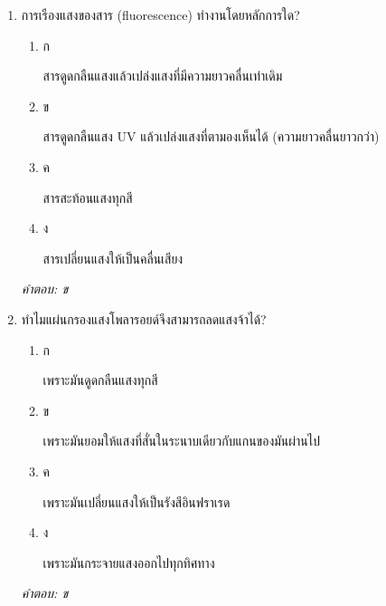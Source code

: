 \documentclass[12pt]{article}
\begin{document}
\begin{enumerate}[label=\arabic*., itemsep=0.5\baselineskip, topsep=0.5\baselineskip, leftmargin=*]
\item การเรืองแสงของสาร (fluorescence) ทำงานโดยหลักการใด?
\begin{enumerate}[label=\alph*)., itemsep=0.3\baselineskip, topsep=0.3\baselineskip]
\item ก\ 
\begin{minipage}[t]{0.9\linewidth}
\raggedright สารดูดกลืนแสงแล้วเปล่งแสงที่มีความยาวคลื่นเท่าเดิม
\end{minipage}
\item ข\ 
\begin{minipage}[t]{0.9\linewidth}
\raggedright สารดูดกลืนแสง UV แล้วเปล่งแสงที่ตามองเห็นได้ (ความยาวคลื่นยาวกว่า)
\end{minipage}
\item ค\ 
\begin{minipage}[t]{0.9\linewidth}
\raggedright สารสะท้อนแสงทุกสี
\end{minipage}
\item ง\ 
\begin{minipage}[t]{0.9\linewidth}
\raggedright สารเปลี่ยนแสงให้เป็นคลื่นเสียง
\end{minipage}
\end{enumerate}
\vspace{-0.3\baselineskip}
\begin{small}
\textit{คำตอบ: ข}
\end{small}

\item ทำไมแผ่นกรองแสงโพลารอยด์จึงสามารถลดแสงจ้าได้?
\begin{enumerate}[label=\alph*)., itemsep=0.3\baselineskip, topsep=0.3\baselineskip]
\item ก\ 
\begin{minipage}[t]{0.9\linewidth}
\raggedright เพราะมันดูดกลืนแสงทุกสี
\end{minipage}
\item ข\ 
\begin{minipage}[t]{0.9\linewidth}
\raggedright เพราะมันยอมให้แสงที่สั่นในระนาบเดียวกับแกนของมันผ่านไป
\end{minipage}
\item ค\ 
\begin{minipage}[t]{0.9\linewidth}
\raggedright เพราะมันเปลี่ยนแสงให้เป็นรังสีอินฟราเรด
\end{minipage}
\item ง\ 
\begin{minipage}[t]{0.9\linewidth}
\raggedright เพราะมันกระจายแสงออกไปทุกทิศทาง
\end{minipage}
\end{enumerate}
\vspace{-0.3\baselineskip}
\begin{small}
\textit{คำตอบ: ข}
\end{small}


\end{enumerate}
\end{document}
